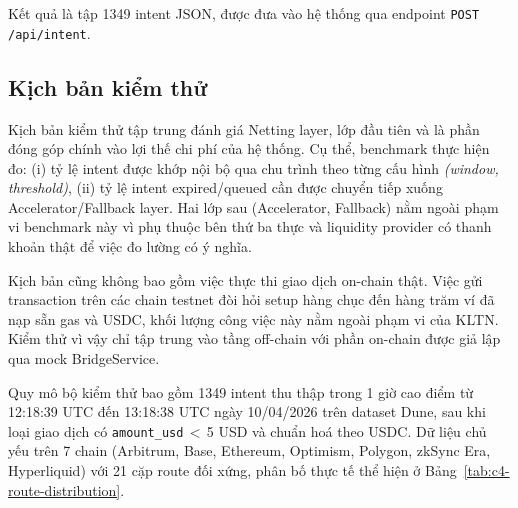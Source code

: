 Kết quả là tập 1349 intent JSON, được đưa vào hệ thống qua endpoint
\texttt{POST /api/intent}.

\subsection{Kịch bản kiểm thử}

Kịch bản kiểm thử tập trung đánh giá Netting layer, lớp đầu tiên và là phần đóng
góp chính vào lợi thế chi phí của hệ thống. Cụ thể, benchmark thực hiện đo: (i) tỷ lệ intent được
khớp nội bộ qua chu trình theo từng cấu hình \emph{(window, threshold)}, (ii) tỷ lệ
intent expired/queued cần được chuyển tiếp xuống Accelerator/Fallback layer. Hai lớp
sau (Accelerator, Fallback) nằm ngoài phạm vi benchmark này vì phụ thuộc bên thứ ba thực
và liquidity provider có thanh khoản thật để việc đo lường có ý nghĩa.

Kịch bản cũng không bao gồm việc thực thi giao dịch on-chain thật. Việc gửi transaction
trên các chain testnet đòi hỏi setup hàng chục đến hàng trăm ví đã nạp sẵn gas và USDC, 
khối lượng công việc
này nằm ngoài phạm vi của KLTN. Kiểm thử vì vậy chỉ tập trung vào tầng off-chain với
phần on-chain được giả lập qua mock BridgeService.

Quy mô bộ kiểm thử bao gồm 1349 intent thu thập trong 1 giờ cao điểm từ 12:18:39 UTC đến 13:18:38 UTC
ngày 10/04/2026 trên dataset Dune, sau khi loại giao dịch có \texttt{amount\_usd}\,$<$\,5 USD
và chuẩn hoá theo USDC. Dữ liệu chủ yếu trên 7 chain (Arbitrum, Base, Ethereum, Optimism,
Polygon, zkSync Era, Hyperliquid) với 21 cặp route đối xứng, phân bố thực tế thể hiện
ở Bảng~\ref{tab:c4-route-distribution}.

